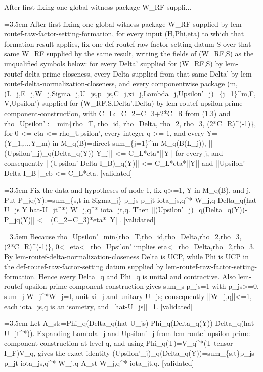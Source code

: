 \documentclass{article}
\newcommand{\step}[1]{\par\noindent\hangindent=3.5em\hangafter=1%
  \makebox[3.5em][l]{\textbf{#1.}}}
\newcommand{\steptag}[1]{\hfill{\small\textsf{[#1]}}}
\begin{document}
\begin{proofbox}{After first fixing one global witness package W\_RF suppli...}
\step{1} After first fixing one global witness package W\_RF supplied by lem-routef-raw-factor-setting-formation, for every input (H,Phi,eta) to which that formation result applies, fix one def-routef-raw-factor-setting datum S over that same W\_RF supplied by the same result, writing the fields of (W\_RF,S) as the unqualified symbols below: for every Delta' supplied for (W\_RF,S) by lem-routef-delta-prime-closeness, every Delta supplied from that same Delta' by lem-routef-delta-normalization-closeness, and every componentwise package (m,(L\_j,E\_j,W\_j,Sigma\_j,U\_js,p\_js,C\_j,xi\_j,Lambda\_j,Upsilon'\_j)\_\{j=1\}\textasciicircum{}m,F,V,Upsilon') supplied for (W\_RF,S,Delta',Delta) by lem-routef-upsilon-prime-component-construction, with C\_L:=C\_2+C\_3+2*C\_R from (1.3) and rho\_Upsilon' := min\{rho\_T, rho\_id, rho\_Delta, rho\_2, rho\_3, (2*C\_R)\textasciicircum{}(-1)\}, for 0 <= eta <= rho\_Upsilon', every integer q >= 1, and every Y=(Y\_1,...,Y\_m) in M\_q(B)=direct-sum\_\{j=1\}\textasciicircum{}m M\_q(B(L\_j)), ||(Upsilon'\_j)\_q(Delta\_q(Y))-Y\_j|| <= C\_L*eta*||Y|| for every j, and consequently ||(Upsilon' Delta-I\_B)\_q(Y)|| <= C\_L*eta*||Y|| and ||Upsilon' Delta-I\_B||\_cb <= C\_L*eta. \steptag{validated} \\[6pt]
\step{1.1} Fix the data and hypotheses of node 1, fix q>=1, Y in M\_q(B), and j. Put P\_jq(Y):=sum\_\{s,t in Sigma\_j\} p\_js p\_jt iota\_js,q\textasciicircum{}* W\_j,q Delta\_q(hat-U\_js Y hat-U\_jt\textasciicircum{}*) W\_j,q\textasciicircum{}* iota\_jt,q. Then ||(Upsilon'\_j)\_q(Delta\_q(Y))-P\_jq(Y)|| <= (C\_2+C\_3)*eta*||Y||. \steptag{validated} \\[6pt]
\step{1.1.1} Because rho\_Upsilon'=min\{rho\_T,rho\_id,rho\_Delta,rho\_2,rho\_3,(2*C\_R)\textasciicircum{}(-1)\}, 0<=eta<=rho\_Upsilon' implies eta<=rho\_Delta,rho\_2,rho\_3. By lem-routef-delta-normalization-closeness Delta is UCP, while Phi is UCP in the def-routef-raw-factor-setting datum supplied by lem-routef-raw-factor-setting-formation. Hence every Delta\_q and Phi\_q is unital and contractive. Also lem-routef-upsilon-prime-component-construction gives sum\_s p\_js=1 with p\_js>=0, sum\_j W\_j\textasciicircum{}*W\_j=I, unit xi\_j and unitary U\_js; consequently ||W\_j,q||<=1, each iota\_js,q is an isometry, and ||hat-U\_js||=1. \steptag{validated} \\[4pt]
\step{1.1.2} Let A\_st:=Phi\_q(Delta\_q(hat-U\_js) Phi\_q(Delta\_q(Y)) Delta\_q(hat-U\_jt\textasciicircum{}*)). Expanding Lambda\_j and Upsilon'\_j from lem-routef-upsilon-prime-component-construction at level q, and using Phi\_q(T)=V\_q\textasciicircum{}*(T tensor I\_F)V\_q, gives the exact identity (Upsilon'\_j)\_q(Delta\_q(Y))=sum\_\{s,t\}p\_js p\_jt iota\_js,q\textasciicircum{}* W\_j,q A\_st W\_j,q\textasciicircum{}* iota\_jt,q. \steptag{validated} \\[4pt]

\end{proofbox}
\end{document}
